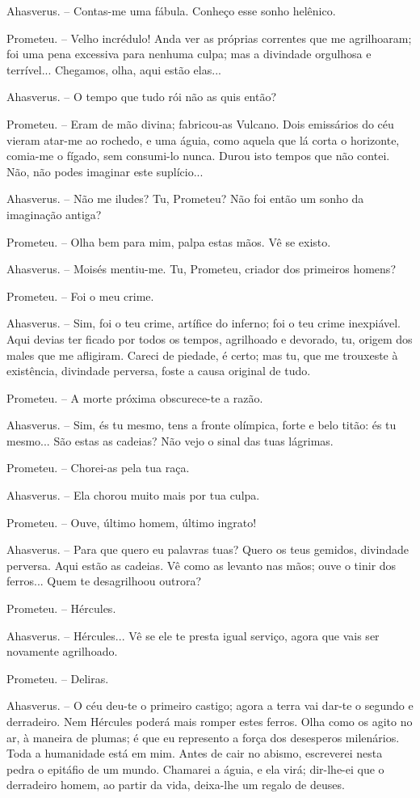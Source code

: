 Ahasverus. -- Contas-me uma fábula. Conheço esse sonho helênico.

Prometeu. -- Velho incrédulo! Anda ver as próprias correntes que me
agrilhoaram; foi uma pena excessiva para nenhuma culpa; mas a divindade
orgulhosa e terrível... Chegamos, olha, aqui estão elas...

Ahasverus. -- O tempo que tudo rói não as quis então?

Prometeu. -- Eram de mão divina; fabricou-as Vulcano. Dois emissários do
céu vieram atar-me ao rochedo, e uma águia, como aquela que lá corta o
horizonte, comia-me o fígado, sem consumi-lo nunca. Durou isto tempos
que não contei. Não, não podes imaginar este suplício...

Ahasverus. -- Não me iludes? Tu, Prometeu? Não foi então um sonho da
imaginação antiga?

Prometeu. -- Olha bem para mim, palpa estas mãos. Vê se existo.

Ahasverus. -- Moisés mentiu-me. Tu, Prometeu, criador dos primeiros
homens?

Prometeu. -- Foi o meu crime.

Ahasverus. -- Sim, foi o teu crime, artífice do inferno; foi o teu crime
inexpiável. Aqui devias ter ficado por todos os tempos, agrilhoado e
devorado, tu, origem dos males que me afligiram. Careci de piedade, é
certo; mas tu, que me trouxeste à existência, divindade perversa, foste
a causa original de tudo.

Prometeu. -- A morte próxima obscurece-te a razão.

Ahasverus. -- Sim, és tu mesmo, tens a fronte olímpica, forte e belo
titão: és tu mesmo... São estas as cadeias? Não vejo o sinal das tuas
lágrimas.

Prometeu. -- Chorei-as pela tua raça.

Ahasverus. -- Ela chorou muito mais por tua culpa.

Prometeu. -- Ouve, último homem, último ingrato!

Ahasverus. -- Para que quero eu palavras tuas? Quero os teus gemidos,
divindade perversa. Aqui estão as cadeias. Vê como as levanto nas mãos;
ouve o tinir dos ferros... Quem te desagrilhoou outrora?

Prometeu. -- Hércules.

Ahasverus. -- Hércules... Vê se ele te presta igual serviço, agora que
vais ser novamente agrilhoado.

Prometeu. -- Deliras.

Ahasverus. -- O céu deu-te o primeiro castigo; agora a terra vai dar-te
o segundo e derradeiro. Nem Hércules poderá mais romper estes ferros.
Olha como os agito no ar, à maneira de plumas; é que eu represento a
força dos desesperos milenários. Toda a humanidade está em mim. Antes de
cair no abismo, escreverei nesta pedra o epitáfio de um mundo. Chamarei
a águia, e ela virá; dir-lhe-ei que o derradeiro homem, ao partir da
vida, deixa-lhe um regalo de deuses.

